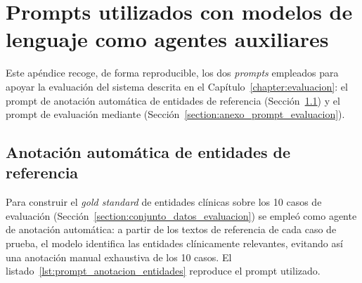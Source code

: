 \chapter{Prompts utilizados con modelos de lenguaje como agentes auxiliares}\label{anexo:claude_opus_4_5}

Este apéndice recoge, de forma reproducible, los dos \textit{prompts} empleados para apoyar la
evaluación del sistema descrita en el Capítulo~\ref{chapter:evaluacion}: el prompt de anotación
automática de entidades de referencia (Sección~\ref{section:anexo_prompt_anotacion}) y el prompt de
evaluación  mediante 
(Sección~\ref{section:anexo_prompt_evaluacion}).

\section{Anotación automática de entidades de referencia}\label{section:anexo_prompt_anotacion}

Para construir el \textit{gold standard} de entidades clínicas sobre los 10 casos de evaluación
(Sección~\ref{section:conjunto_datos_evaluacion}) se empleó  como agente de anotación
automática: a partir de los textos de referencia de cada caso de prueba, el modelo identifica
las entidades clínicamente relevantes, evitando así una anotación manual exhaustiva de los
10 casos. El listado~\ref{lst:prompt_anotacion_entidades} reproduce el prompt utilizado.


